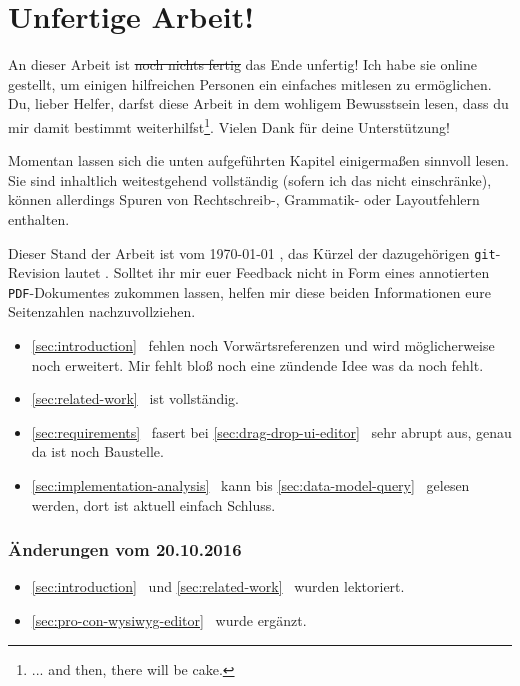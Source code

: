 \documentclass[paper=a4,fontsize=12pt,parskip=half,twoside]{scrartcl}
\title{\doctitle}
\subtitle{\docsubtitle}
\author{\docauthors}
\date{\today{}}
\begin{document}


\newpage

\section*{Unfertige Arbeit!}

An dieser Arbeit ist \sout{noch nichts fertig} das Ende unfertig! Ich habe sie online gestellt, um einigen hilfreichen Personen ein einfaches mitlesen zu ermöglichen. Du, lieber Helfer, darfst diese Arbeit in dem wohligem Bewusstsein lesen, dass du mir damit bestimmt weiterhilfst\footnote{... and then, there will be cake.}. Vielen Dank für deine Unterstützung!

Momentan lassen sich die unten aufgeführten Kapitel einigermaßen sinnvoll lesen. Sie sind inhaltlich weitestgehend vollständig (sofern ich das nicht einschränke), können allerdings Spuren von Rechtschreib-, Grammatik- oder Layoutfehlern enthalten.

Dieser Stand der Arbeit ist vom \today{} \currenttime{}, das Kürzel der dazugehörigen \texttt{git}-Revision lautet \texttt{}. Solltet ihr mir euer Feedback nicht in Form eines annotierten \texttt{PDF}-Dokumentes zukommen lassen, helfen mir diese beiden Informationen eure Seitenzahlen nachzuvollziehen.

\begin{itemize}[noitemsep]
\item \ref{sec:introduction}~ fehlen noch Vorwärtsreferenzen und wird möglicherweise noch erweitert. Mir fehlt bloß noch eine zündende Idee was da noch fehlt.
\item \ref{sec:related-work}~ ist vollständig.
\item \ref{sec:requirements}~ fasert bei \ref{sec:drag-drop-ui-editor}~ sehr abrupt aus, genau da ist noch Baustelle.
\item \ref{sec:implementation-analysis}~ kann bis \ref{sec:data-model-query}~ gelesen werden, dort ist aktuell einfach Schluss.
\end{itemize}

\subsubsection*{Änderungen vom 20.10.2016}
\begin{itemize}[noitemsep]
\item \ref{sec:introduction}~ und \ref{sec:related-work}~ wurden lektoriert.
  \item \ref{sec:pro-con-wysiwyg-editor}~ wurde ergänzt.
\end{itemize}
\end{document}

